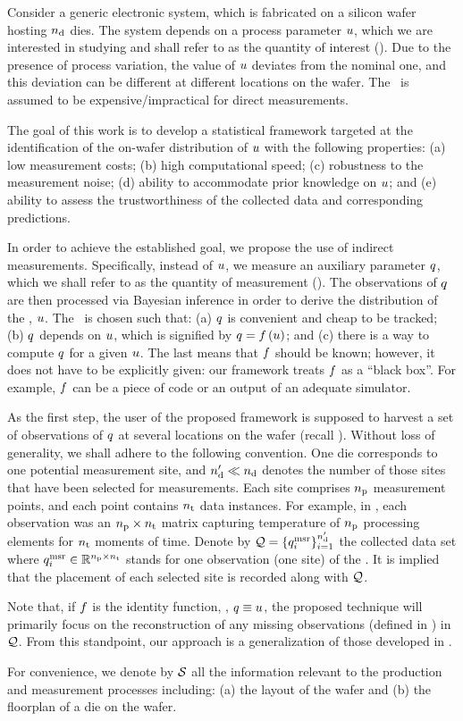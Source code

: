Consider a generic electronic system, which is fabricated on a silicon wafer hosting ${n_\text{d}}$ dies.
The system depends on a process parameter $u$, which we are interested in studying and shall refer to as the quantity of interest (\qoi).
Due to the presence of process variation, the value of $u$ deviates from the nominal one, and this deviation can be different at different locations on the wafer.
The \qoi\ is assumed to be expensive/impractical for direct measurements.

The goal of this work is to develop a statistical framework targeted at the identification of the on-wafer distribution of $u$ with the following properties: (a) low measurement costs; (b) high computational speed; (c) robustness to the measurement noise; (d) ability to accommodate prior knowledge on $u$; and (e) ability to assess the trustworthiness of the collected data and corresponding predictions.

In order to achieve the established goal, we propose the use of indirect measurements.
Specifically, instead of $u$, we measure an auxiliary parameter $q$, which we shall refer to as the quantity of measurement (\qom).
The observations of $q$ are then processed via Bayesian inference in order to derive the distribution of the \qoi, $u$.
The \qom\ is chosen such that: (a) $q$ is convenient and cheap to be tracked; (b) $q$ depends on $u$, which is signified by $\q = \oBB{\u}$; and (c) there is a way to compute $q$ for a given $u$.
The last means that $\oBB$ should be known; however, it does not have to be explicitly given: our framework treats $\oBB$ as a ``black box''.
For example, $\oBB$ can be a piece of code or an output of an adequate simulator.

As the first step, the user of the proposed framework is supposed to harvest a set of observations of $q$ at several locations on the wafer (recall ).
Without loss of generality, we shall adhere to the following convention.
One die corresponds to one potential measurement site, and ${n_\text{d}'} \ll {n_\text{d}}$ denotes the number of those sites that have been selected for measurements.
Each site comprises ${n_\text{p}}$ measurement points, and each point contains ${n_\text{t}}$ data instances.
For example, in , each observation was an ${n_\text{p}} \times {n_\text{t}}$ matrix capturing temperature of ${n_\text{p}}$ processing elements for ${n_\text{t}}$ moments of time.
Denote by $\mathcal{Q} = \{ q_i^{\text{msr}} \}_{i = 1}^{n_\text{d}'}$ the collected data set where $q_i^{\text{msr}} \in \mathbb{R}^{{n_\text{p}} \times {n_\text{t}}}$ stands for one observation (one site) of the \qom.
It is implied that the placement of each selected site is recorded along with $\mathcal{Q}$.

Note that, if $\oBB$ is the identity function, \ie, $q \equiv u$, the proposed technique will primarily focus on the reconstruction of any missing observations (defined in ) in $\mathcal{Q}$.
From this standpoint, our approach is a generalization of those developed in \cite{zhang2010, reda2009}.

For convenience, we denote by $\mathcal{S}$ all the information relevant to the production and measurement processes including: (a) the layout of the wafer and (b) the floorplan of a die on the wafer.

